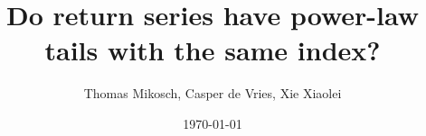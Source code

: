 \documentclass[11pt,a4]{amsart}
\newcommand{\1}{{\mathbf 1}}
\begin{document}
\title{Do return series have power-law tails with the same index?}
\author{Thomas Mikosch,  Casper de Vries, Xie Xiaolei}
\date{\today}

\maketitle

\begin{abstract}
\end{abstract}
\end{document}
